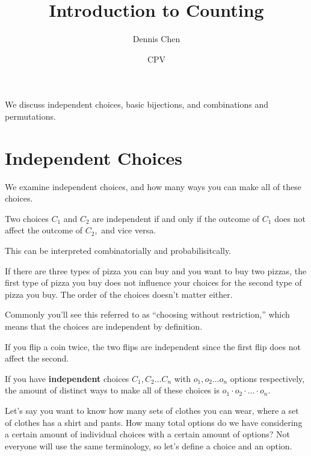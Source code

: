 \documentclass{article}
\title{Introduction to Counting}
\author{Dennis Chen}
\date{CPV}
\begin{document}
\maketitle

We discuss independent choices, basic bijections, and combinations and permutations.

\section{Independent Choices}

We examine independent choices, and how many ways you can make all of these choices.

\begin{defi}
Two choices $C_1$ and $C_2$ are independent if and only if the outcome of $C_1$ does not affect the outcome of $C_2,$ and vice versa.
\end{defi}

This can be interpreted combinatorially and probabilisitcally.

\begin{exam}
If there are three types of pizza you can buy and you want to buy two pizzas, the first type of pizza you buy does not influence your choices for the second type of pizza you buy. The order of the choices doesn't matter either.
\end{exam}

Commonly you'll see this referred to as ``choosing without restriction,'' which means that the choices are independent by definition.

\begin{exam}
If you flip a coin twice, the two flips are independent since the first flip does not affect the second.
\end{exam}

\begin{theo}
If you have \textbf{independent} choices $C_1,C_2\dots C_n$ with $o_1,o_2\dots o_n$ options respectively, the amount of distinct ways to make all of these choices is $o_1\cdot o_2\cdot\dots\cdot o_n.$
\end{theo}

Let's say you want to know how many sets of clothes you can wear, where a set of clothes has a shirt and pants. How many total options do we have considering a certain amount of individual choices with a certain amount of options? Not everyone will use the same terminology, so let's define a choice and an option.
\end{document}
